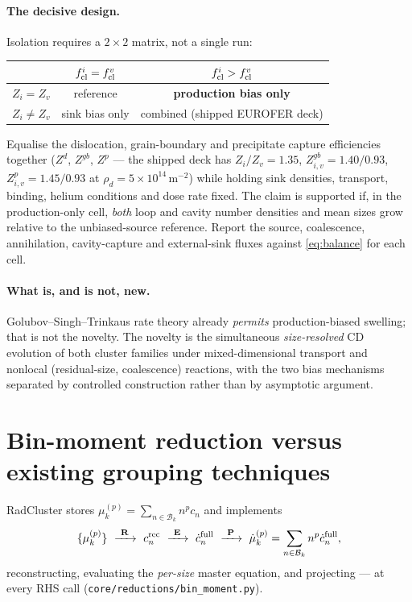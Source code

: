 \documentclass[11pt,a4paper]{article}
\newcommand{\code}[1]{\texttt{\small #1}}
\begin{document}
\paragraph{The decisive design.}
Isolation requires a $2\times2$ matrix, not a single run:

\begin{center}\footnotesize
\begin{tabular}{l|cc}
& $f^i_{\rm cl}=f^v_{\rm cl}$ & $f^i_{\rm cl}>f^v_{\rm cl}$ \\
\midrule
$Z_i=Z_v$    & reference        & \textbf{production bias only} \\
$Z_i\neq Z_v$ & sink bias only   & combined (shipped EUROFER deck) \\
\end{tabular}
\end{center}

\noindent Equalise the dislocation, grain-boundary and precipitate capture
efficiencies together ($Z^d$, $Z^{gb}$, $Z^p$ --- the shipped deck has
$Z_i/Z_v=1.35$, $Z^{gb}_{i,v}=1.40/0.93$, $Z^{p}_{i,v}=1.45/0.93$ at
$\rho_d=5\times10^{14}\,\mathrm{m^{-2}}$) while holding sink densities,
transport, binding, helium conditions and dose rate fixed. The claim is supported
if, in the production-only cell, \emph{both} loop and cavity number densities and
mean sizes grow relative to the unbiased-source reference. Report the source,
coalescence, annihilation, cavity-capture and external-sink fluxes against
\eqref{eq:balance} for each cell.

\paragraph{What is, and is not, new.}
Golubov--Singh--Trinkaus rate theory already \emph{permits} production-biased
swelling; that is not the novelty. The novelty is the simultaneous
\emph{size-resolved} CD evolution of both cluster families under mixed-dimensional
transport and nonlocal (residual-size, coalescence) reactions, with the two bias
mechanisms separated by controlled construction rather than by asymptotic argument.

\section{Bin-moment reduction versus existing grouping techniques}

RadCluster stores $\mu^{(p)}_k=\sum_{n\in\mathcal{B}_k}n^p c_n$ and implements
\[
\{\mu^{(p)}_k\}\ \xrightarrow{\ \textbf{R}\ }\ c^{\rm rec}_n
\ \xrightarrow{\ \textbf{E}\ }\ \dot c^{\rm full}_n
\ \xrightarrow{\ \textbf{P}\ }\ \dot\mu^{(p)}_k=\sum_{n\in\mathcal{B}_k}n^p\dot c^{\rm full}_n ,
\]
reconstructing, evaluating the \emph{per-size} master equation, and projecting --- at
every RHS call (\code{core/reductions/bin\_moment.py}).
\end{document}
